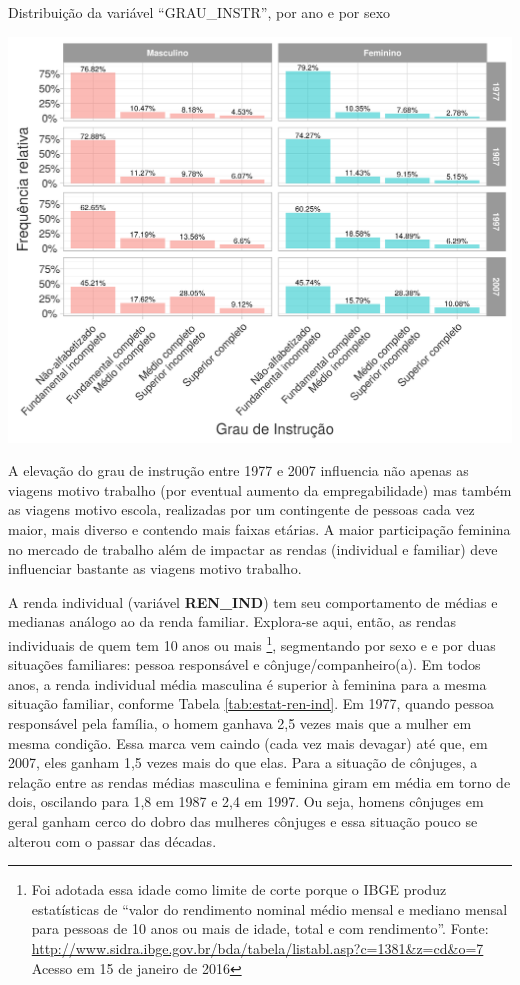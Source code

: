 \begin{grafico}[htb]%
    \caption{\label{graf:distr-grau-instr} Distribuição da variável ``GRAU_INSTR'', por ano e por sexo}%
    \begin{center}%
        \includegraphics[width=1\textwidth]{./imagens/grau-instr.png}%
    \end{center}%
\end{grafico}%

A elevação do grau de instrução entre 1977 e 2007 influencia não apenas as viagens motivo trabalho (por eventual aumento da empregabilidade) mas também as viagens motivo escola, realizadas por um contingente de pessoas cada vez maior, mais diverso e contendo mais faixas etárias.
A maior participação feminina no mercado de trabalho além de impactar as rendas (individual e familiar) deve influenciar bastante as viagens motivo trabalho. 

A renda individual (variável \textbf{REN_IND}) tem seu comportamento de médias e medianas análogo ao da renda familiar. Explora-se aqui, então, as rendas individuais de quem tem 10 anos ou mais
\footnote{Foi adotada essa idade como limite de corte porque o IBGE produz estatísticas de ``valor do rendimento nominal médio mensal e mediano mensal para pessoas de 10 anos ou mais de idade, total e com rendimento''. Fonte: \url{http://www.sidra.ibge.gov.br/bda/tabela/listabl.asp?c=1381&z=cd&o=7} Acesso em 15 de janeiro de 2016}, 
segmentando por sexo e e por duas situações familiares: pessoa responsável e cônjuge/companheiro(a).
Em todos anos, a renda individual média masculina é superior à feminina para a mesma situação familiar, conforme Tabela \ref{tab:estat-ren-ind}. 
Em 1977, quando pessoa responsável pela família, o homem ganhava 2,5 vezes mais que a mulher em mesma condição. Essa marca vem caindo (cada vez mais devagar) até que, em 2007, eles ganham 1,5 vezes mais do que elas.
Para a situação de cônjuges, a relação entre as rendas médias masculina e feminina giram em média em torno de dois, oscilando para 1,8 em 1987 e 2,4 em 1997. Ou seja, homens cônjuges em geral ganham cerco do dobro das mulheres cônjuges e essa situação pouco se alterou com o passar das décadas.

